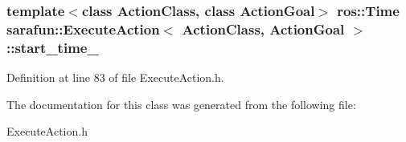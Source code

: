 \hypertarget{classsarafun_1_1ExecuteAction_ad7a81f5e505c421c57bc32fa35e3e84f_ad7a81f5e505c421c57bc32fa35e3e84f}{
\subsubsection[{start\-\_\-time\-\_\-}]{\setlength{\rightskip}{0pt plus 5cm}template$<$class Action\-Class, class Action\-Goal$>$ ros\-::\-Time {\bf sarafun\-::\-Execute\-Action}$<$ Action\-Class, Action\-Goal $>$\-::start\-\_\-time\-\_\-\hspace{0.3cm}{\ttfamily [private]}}}\label{classsarafun_1_1ExecuteAction_ad7a81f5e505c421c57bc32fa35e3e84f_ad7a81f5e505c421c57bc32fa35e3e84f}


Definition at line 83 of file Execute\-Action.\-h.



The documentation for this class was generated from the following file\-:\begin{DoxyCompactItemize}
\item 
Execute\-Action.\-h\end{DoxyCompactItemize}
